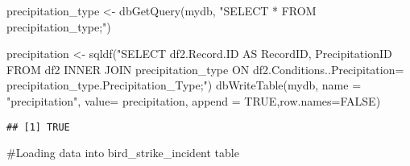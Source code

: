 \documentclass[
]{article}
\newenvironment{Shaded}{\begin{snugshade}}{\end{snugshade}}
\newcommand{\AttributeTok}[1]{\textcolor[rgb]{0.77,0.63,0.00}{#1}}
\newcommand{\ConstantTok}[1]{\textcolor[rgb]{0.00,0.00,0.00}{#1}}
\newcommand{\FunctionTok}[1]{\textcolor[rgb]{0.00,0.00,0.00}{#1}}
\newcommand{\NormalTok}[1]{#1}
\newcommand{\OtherTok}[1]{\textcolor[rgb]{0.56,0.35,0.01}{#1}}
\newcommand{\StringTok}[1]{\textcolor[rgb]{0.31,0.60,0.02}{#1}}
\begin{document}
\begin{Shaded}
\begin{Highlighting}[]
\NormalTok{precipitation\_type }\OtherTok{\textless{}{-}} \FunctionTok{dbGetQuery}\NormalTok{(mydb, }\StringTok{"SELECT * FROM \textasciigrave{}precipitation\_type\textasciigrave{};"}\NormalTok{)}

\NormalTok{precipitation }\OtherTok{\textless{}{-}} \FunctionTok{sqldf}\NormalTok{(}\StringTok{"SELECT df2.\textasciigrave{}Record.ID\textasciigrave{} AS RecordID, PrecipitationID }
\StringTok{                       FROM df2 INNER JOIN precipitation\_type }
\StringTok{                       ON df2.\textquotesingle{}Conditions..Precipitation\textquotesingle{}= precipitation\_type.Precipitation\_Type;"}\NormalTok{)}
\FunctionTok{dbWriteTable}\NormalTok{(mydb, }\AttributeTok{name =} \StringTok{"precipitation"}\NormalTok{, }\AttributeTok{value=}\NormalTok{ precipitation, }\AttributeTok{append =} \ConstantTok{TRUE}\NormalTok{,}\AttributeTok{row.names=}\ConstantTok{FALSE}\NormalTok{)}
\end{Highlighting}
\end{Shaded}

\begin{verbatim}
## [1] TRUE
\end{verbatim}

\#Loading data into bird\_strike\_incident table
\end{document}
